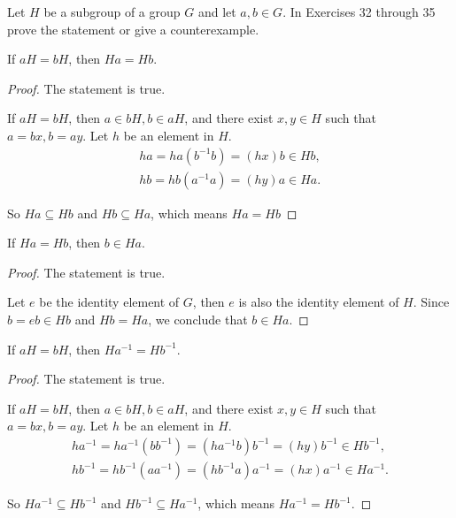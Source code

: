 Let $H$ be a subgroup of a group $G$ and let $a, b\in G$. In Exercises 32 through 35 prove the statement or give a counterexample.

\begin{exercise}
    If $aH = bH$, then $Ha = Hb$.
\end{exercise}

\begin{proof}
    The statement is true.

    If $aH = bH$, then $a\in bH, b\in aH$, and there exist $x, y\in H$ such that $a = bx, b = ay$. Let $h$ be an element in $H$.
    \[
        \begin{split}
            ha = ha(b^{-1}b) = (hx)b\in Hb, \\
            hb = hb(a^{-1}a) = (hy)a\in Ha.
        \end{split}
    \]

    So $Ha\subseteq Hb$ and $Hb\subseteq Ha$, which means $Ha = Hb$
\end{proof}

\begin{exercise}
    If $Ha = Hb$, then $b\in Ha$.
\end{exercise}

\begin{proof}
    The statement is true.

    Let $e$ be the identity element of $G$, then $e$ is also the identity element of $H$. Since $b = eb\in Hb$ and $Hb = Ha$, we conclude that $b\in Ha$.
\end{proof}

\begin{exercise}
    If $aH = bH$, then $Ha^{-1} = Hb^{-1}$.
\end{exercise}

\begin{proof}
    The statement is true.

    If $aH = bH$, then $a\in bH, b\in aH$, and there exist $x, y\in H$ such that $a = bx, b = ay$. Let $h$ be an element in $H$.
    \[
        \begin{split}
            ha^{-1} = ha^{-1}(bb^{-1}) = (ha^{-1}b)b^{-1} = (hy)b^{-1} \in Hb^{-1}, \\
            hb^{-1} = hb^{-1}(aa^{-1}) = (hb^{-1}a)a^{-1} = (hx)a^{-1} \in Ha^{-1}.
        \end{split}
    \]

    So $Ha^{-1} \subseteq Hb^{-1}$ and $Hb^{-1} \subseteq Ha^{-1}$, which means $Ha^{-1} = Hb^{-1}$.
\end{proof}

